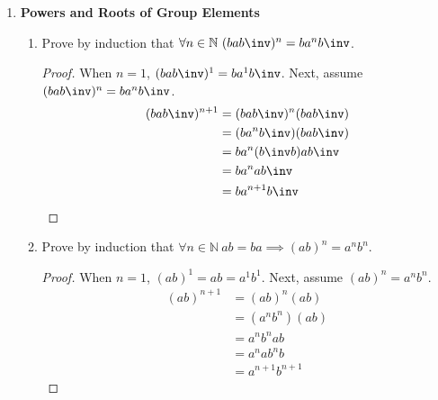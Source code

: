 \begin{enumerate}[label={\Alph*.},font={\bfseries}]
\begin{enumerate}[label={\arabic*},font={\bfseries}]
\begin{proof}
    \end{proof}
  \item Suppose $\forall g \in G\ g = g\inv$ and $\forall h \in H\ h = h\inv$. Prove that $\forall (g,h) \in G \times H\ (g,h) = (g,h)\inv$.
    \begin{proof}
      \begin{align*}
        (g,h)(g,h) &= (g,h)(g\inv,h\inv) \\
        &= (gg\inv,hh\inv) \\
        &= (e_G,e_H) = e_{G \times H} \\
        &= (g,h)(g,h)\inv \\
        (g,h) &= (g,h)\inv
      \end{align*}
    \end{proof}
  \end{enumerate}
  \newpage
\item {\bf Powers and Roots of Group Elements}
  \begin{enumerate}[label={\arabic*},font={\bfseries}]
  \item Prove by induction that $\forall n \in \mathbb{N}\ (bab\inv)^n = ba^nb\inv$.
    \begin{proof}
      When $n=1$, $(bab\inv)^1 = ba^1b\inv$. Next, assume $(bab\inv)^n = ba^nb\inv$.
      \begin{align*}
        (bab\inv)^{n+1} &= (bab\inv)^n(bab\inv) \\
        &= (ba^nb\inv)(bab\inv) \\
        &= ba^n({b\inv}b)ab\inv \\
        &= ba^nab\inv \\
        &= ba^{n+1}b\inv
      \end{align*}
    \end{proof}
  \item Prove by induction that $\forall n \in \mathbb{N}\ ab = ba \implies (ab)^n = a^nb^n$.
    \begin{proof}
      When $n=1$, $(ab)^1 = ab = a^1b^1$. Next, assume $(ab)^n = a^nb^n$.
      \begin{align*}
        (ab)^{n+1} &= (ab)^n(ab) \\
        &= (a^nb^n)(ab) \\
        &= a^nb^nab \\
        &= a^nab^nb \\
        &= a^{n+1}b^{n+1}
      \end{align*}

\end{proof}
\end{enumerate}
\end{enumerate}
